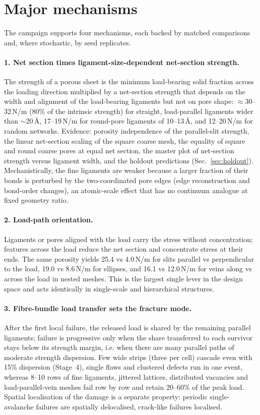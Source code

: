 \section{Major mechanisms}
\label{sec:mech}
The campaign supports four mechanisms, each backed by matched comparisons and, where stochastic, by seed replicates.

\paragraph{1. Net section times ligament-size-dependent net-section strength.} The strength of a porous sheet is the minimum load-bearing solid fraction across the loading direction multiplied by a net-section strength that depends on the width and alignment of the load-bearing ligaments but not on pore shape: $\approx$30--32\,N/m (80\% of the intrinsic strength) for straight, load-parallel ligaments wider than $\sim$20\,\AA, 17--19\,N/m for round-pore ligaments of 10--13\,\AA, and 12--20\,N/m for random networks. Evidence: porosity independence of the parallel-slit strength, the linear net-section scaling of the square coarse mesh, the equality of square and round coarse pores at equal net section, the master plot of net-section strength versus ligament width, and the holdout predictions (Sec.~\ref{sec:holdout}). Mechanistically, the fine ligaments are weaker because a larger fraction of their bonds is perturbed by the two-coordinated pore edges (edge reconstruction and bond-order changes), an atomic-scale effect that has no continuum analogue at fixed geometry ratio.

\paragraph{2. Load-path orientation.} Ligaments or pores aligned with the load carry the stress without concentration; features across the load reduce the net section and concentrate stress at their ends. The same porosity yields 25.4 vs 4.0\,N/m for slits parallel vs perpendicular to the load, 19.0 vs 8.6\,N/m for ellipses, and 16.1 vs 12.0\,N/m for veins along vs across the load in nested meshes. This is the largest single lever in the design space and acts identically in single-scale and hierarchical structures.

\paragraph{3. Fibre-bundle load transfer sets the fracture mode.} After the first local failure, the released load is shared by the remaining parallel ligaments; failure is progressive only when the share transferred to each survivor stays below its strength margin, i.e. when there are many parallel paths of moderate strength dispersion. Few wide strips (three per cell) cascade even with 15\% dispersion (Stage~4), single flaws and clustered defects run in one event, whereas 8--10 rows of fine ligaments, jittered lattices, distributed vacancies and load-parallel-vein meshes fail row by row and retain 20--60\% of the peak load. Spatial localisation of the damage is a separate property: periodic single-avalanche failures are spatially delocalised, crack-like failures localised.


